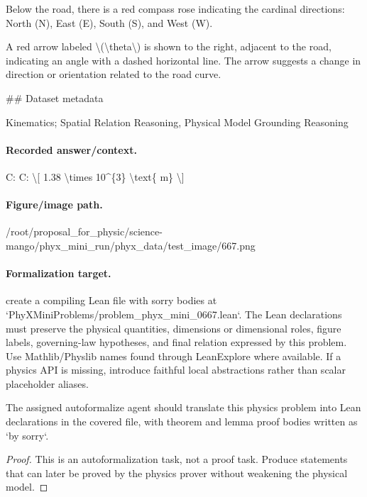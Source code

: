 Below the road, there is a red compass rose indicating the cardinal directions: North (N), East (E), South (S), and West (W).

A red arrow labeled \textbackslash{}(\textbackslash{}theta\textbackslash{}) is shown to the right, adjacent to the road, indicating an angle with a dashed horizontal line. The arrow suggests a change in direction or orientation related to the road curve.

\#\# Dataset metadata

Kinematics; Spatial Relation Reasoning, Physical Model Grounding Reasoning

\paragraph{Recorded answer/context.}
C: C: \textbackslash{}[ 1.38 \textbackslash{}times 10\textasciicircum{}\{3\} \textbackslash{}text\{ m\} \textbackslash{}]

\paragraph{Figure/image path.}
/root/proposal\_for\_physic/science-mango/phyx\_mini\_run/phyx\_data/test\_image/667.png

\paragraph{Formalization target.}
create a compiling Lean file with sorry bodies at `PhyXMiniProblems/problem\_phyx\_mini\_0667.lean`. The Lean declarations must preserve the physical quantities, dimensions or dimensional roles, figure labels, governing-law hypotheses, and final relation expressed by this problem.
Use Mathlib/Physlib names found through LeanExplore where available. If a physics API is missing, introduce faithful local abstractions rather than scalar placeholder aliases.

\begin{theorem}
\label{thm:physics:phyx_mini_0667:target}
The assigned autoformalize agent should translate this physics problem into Lean declarations in the covered file, with theorem and lemma proof bodies written as `by sorry`.
\end{theorem}
\begin{proof}
This is an autoformalization task, not a proof task. Produce statements that can later be proved by the physics prover without weakening the physical model.
\end{proof}

